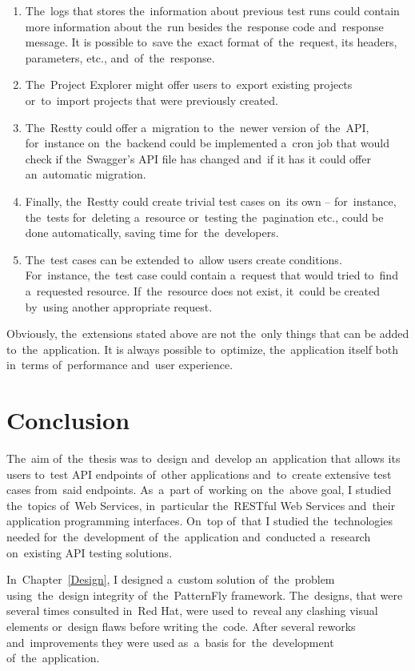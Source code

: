 \begin{enumerate}
  \item The~logs that stores the~information about previous test runs could contain more information about the~run besides the~response code and~response message.
  It is possible to~save the~exact format of~the~request, its headers, parameters, etc., and~of~the~response.
  \item The~Project Explorer might offer users to~export existing projects or~to~import projects that were previously created.
  \item The~Restty could offer a~migration to~the~newer version of~the~API, for~instance on~the~backend could be implemented a~cron job that would check if
  the~Swagger's API file has changed and~if it has it could offer an~automatic migration.
  \item Finally, the~Restty could create trivial test cases on~its own -- for~instance, the~tests for~deleting a~resource or~testing the~pagination etc., could
  be done automatically, saving time for~the~developers. 
  \item The~test cases can be extended to~allow users create conditions. For~instance, the~test case could contain a~request that would tried to~find
  a~requested resource. If~the~resource does not exist, it~could be created by~using another appropriate request.
\end{enumerate}

Obviously, the~extensions stated above are not the~only things that can be added to~the~application. It is always possible to~optimize,
the~application itself both in~terms of~performance and~user experience.

\chapter{Conclusion}
The~aim of~the~thesis was to~design and~develop an~application that allows its users
to~test API endpoints of~other applications and~to~create extensive test cases from~said endpoints.
As~a~part of~working on~the~above goal, I studied the~topics of~Web Services, in~particular the~RESTful
Web Services and~their application programming interfaces. On~top of~that I studied the~technologies needed
for~the~development of~the~application and~conducted a~research on~existing API testing solutions.

In~Chapter~\ref{Design}, I designed a~custom solution of~the~problem using~the~design integrity of~the~PatternFly
framework. The~designs, that were several times consulted in~Red Hat, were used to~reveal any clashing visual elements
or~design flaws before writing the~code. After several reworks and~improvements they were used as~a~basis
for~the~development of~the~application.

